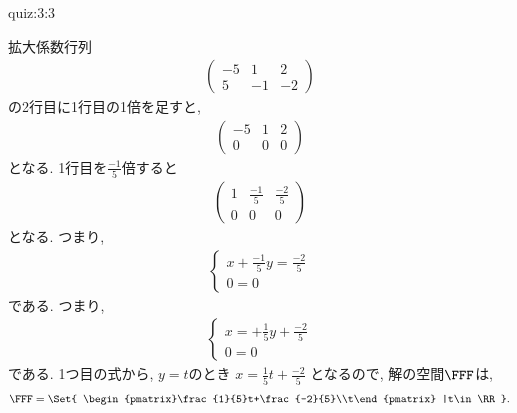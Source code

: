 \begin{answerof}{quiz:3:3}

  拡大係数行列
  \begin{align*}
    \begin{pmatrix}-5&1&2\\5&-1&-2\end{pmatrix}
  \end{align*}
  の2行目に1行目の1倍を足すと,
  \begin{align*}
    \begin{pmatrix}-5&1&2\\0&0&0\end{pmatrix}
  \end{align*}
  となる. 1行目を$\frac{-1}{5}$倍すると
  \begin{align*}
    \begin{pmatrix}1&\frac{-1}{5}&\frac{-2}{5}\\0&0&0\end{pmatrix}
  \end{align*}
  となる. つまり,
  \begin{align*}
    \begin{cases}
      x+\frac{-1}{5}y=\frac{-2}{5}\\
      0=0
    \end{cases}
  \end{align*}
  である.
  つまり,
  \begin{align*}
    \begin{cases}
      x=+\frac{1}{5}y+\frac{-2}{5}\\
      0=0
    \end{cases}
  \end{align*}
  である.
  1つ目の式から, $y=t$のとき
  $x=\frac{1}{5}t+\frac{-2}{5}$
  となるので,
  解の空間$\FFF$は,
  \begin{align*}
    \FFF=
    \Set{
     \begin{pmatrix}\frac{1}{5}t+\frac{-2}{5}\\t\end{pmatrix}
        |t\in \RR
        }.
  \end{align*}



\end{answerof}
